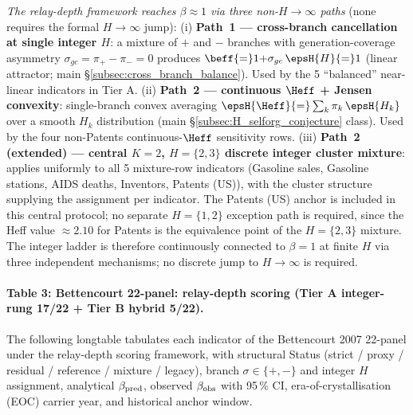 \textit{The relay-depth framework reaches $\beta\!\approx\!1$ via three non-$H\!\to\!\infty$ paths} (none requires the formal $H\!\to\!\infty$ jump):
(i) \textbf{Path~1 — cross-branch cancellation at single integer $H$}: a mixture of $+$ and $-$ branches with generation-coverage asymmetry $\sigma_{gc}{=}\pi_{+}{-}\pi_{-}{=}0$ produces $\beff{=}1{+}\sigma_{gc}\,\epsH{H}{=}1$ (linear attractor; main \S\ref{subsec:cross_branch_balance}). Used by the 5 ``balanced'' near-linear indicators in Tier A.
(ii) \textbf{Path~2 — continuous $\Heff$ + Jensen convexity}: single-branch convex averaging $\epsH{\Heff}{=}\sum_k\pi_k\,\epsH{H_k}$ over a smooth $H_k$ distribution (main \S\ref{subsec:H_selforg_conjecture} class). Used by the four non-Patents continuous-$\Heff$ sensitivity rows.
(iii) \textbf{Path~2 (extended) — central $K{=}2$, $H{=}\{2,3\}$ discrete integer cluster mixture}: applies uniformly to all 5 mixture-row indicators (Gasoline sales, Gasoline stations, AIDS deaths, Inventors, Patents (US)), with the cluster structure supplying the assignment per indicator. The Patents (US) anchor is included in this central protocol; no separate $H{=}\{1,2\}$ exception path is required, since the Heff value $\approx 2.10$ for Patents is the equivalence point of the $H{=}\{2,3\}$ mixture.
The integer ladder is therefore continuously connected to $\beta{=}1$ at finite $H$ via three independent mechanisms; no discrete jump to $H\!\to\!\infty$ is required.

\clearpage  %
\vspace{-0.6cm}

\paragraph{\large Table 3: Bettencourt 22-panel: relay-depth scoring (Tier A integer-rung 17/22 + Tier B hybrid 5/22).}\label{tab:22panel_scoring} The following longtable tabulates each indicator of the Bettencourt 2007 22-panel under the relay-depth scoring framework, with structural Status (strict / proxy / residual / reference / mixture / legacy), branch \(\sigma\in\{+,-\}\) and integer \(H\) assignment, analytical \(\beta_{\rm pred}\), observed \(\beta_{\rm obs}\) with 95\,\% CI, era-of-crystallisation (EOC) carrier year, and historical anchor window.

